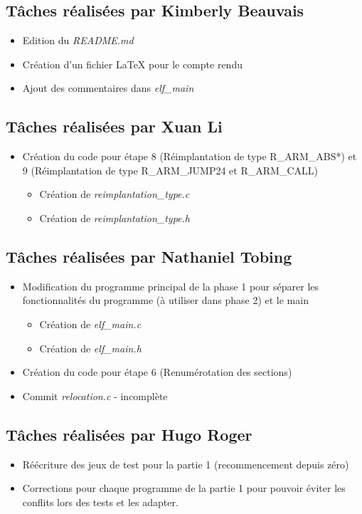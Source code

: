 \documentclass[11pt,letterpaper]{article}
\begin{document}
\subsection*{Tâches réalisées par Kimberly Beauvais}
\begin{itemize}
    \item Edition du \textit{README.md}
    \item Création d'un fichier LaTeX pour le compte rendu 
    \item Ajout des commentaires dans \textit{elf\_main}
\end{itemize}

\subsection*{Tâches réalisées par Xuan Li}
\begin{itemize}
    \item Création du code pour étape 8 (Réimplantation de type R\_ARM\_ABS*) et 
    9 (Réimplantation de type R\_ARM\_JUMP24 et R\_ARM\_CALL) 
    \begin{itemize}
        \item Création de \textit{reimplantation\_type.c}  
        \item Création de \textit{reimplantation\_type.h} 
    \end{itemize}
\end{itemize}

\subsection*{Tâches réalisées par Nathaniel Tobing}
\begin{itemize}
    \item Modification du programme principal de la phase 1 pour séparer les 
    fonctionnalités du programme (à utiliser dans phase 2) et le main 
    \begin{itemize}
        \item Création de \textit{elf\_main.c}  
        \item Création de \textit{elf\_main.h} 
    \end{itemize}
    \item Création du code pour étape 6 (Renumérotation des sections)
    \item Commit \textit{relocation.c} - incomplète
\end{itemize}

\subsection*{Tâches réalisées par Hugo Roger}
\begin{itemize}
    \item Réécriture des jeux de test pour la partie 1 (recommencement depuis zéro)
    \item Corrections pour chaque programme de la partie 1 pour pouvoir éviter les 
    conflits lors des tests et les adapter.
\end{itemize}
\end{document}
